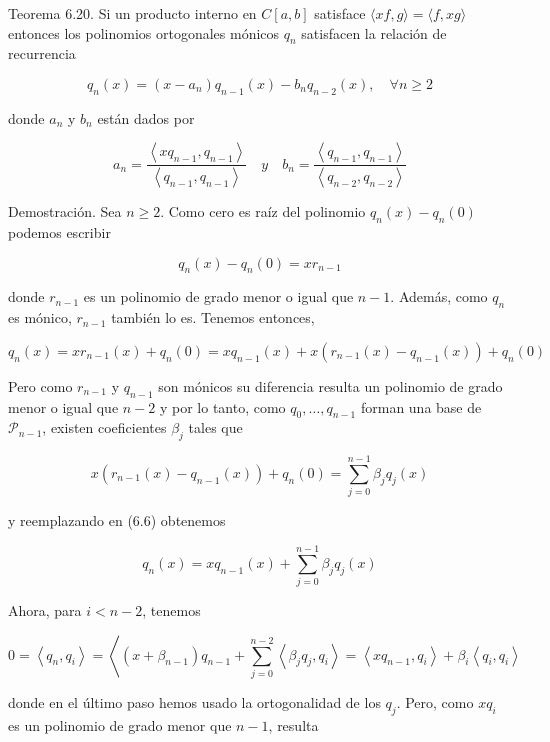 \documentclass[10pt]{book}
\begin{document}
Teorema 6.20. Si un producto interno en $C[a, b]$ satisface $\langle x f, g\rangle=\langle f, x g\rangle$ entonces los polinomios ortogonales mónicos $q_{n}$ satisfacen la relación de recurrencia


\begin{equation*}
q_{n}(x)=\left(x-a_{n}\right) q_{n-1}(x)-b_{n} q_{n-2}(x), \quad \forall n \geq 2 \tag{6.5}
\end{equation*}


donde $a_{n}$ y $b_{n}$ están dados por

$$
a_{n}=\frac{\left\langle x q_{n-1}, q_{n-1}\right\rangle}{\left\langle q_{n-1}, q_{n-1}\right\rangle} \quad y \quad b_{n}=\frac{\left\langle q_{n-1}, q_{n-1}\right\rangle}{\left\langle q_{n-2}, q_{n-2}\right\rangle}
$$

Demostración. Sea $n \geq 2$. Como cero es raíz del polinomio $q_{n}(x)-q_{n}(0)$ podemos escribir

$$
q_{n}(x)-q_{n}(0)=x r_{n-1}
$$

donde $r_{n-1}$ es un polinomio de grado menor o igual que $n-1$. Además, como $q_{n}$ es mónico, $r_{n-1}$ también lo es. Tenemos entonces,


\begin{equation*}
q_{n}(x)=x r_{n-1}(x)+q_{n}(0)=x q_{n-1}(x)+x\left(r_{n-1}(x)-q_{n-1}(x)\right)+q_{n}(0) \tag{6.6}
\end{equation*}


Pero como $r_{n-1}$ y $q_{n-1}$ son mónicos su diferencia resulta un polinomio de grado menor o igual que $n-2$ y por lo tanto, como $q_{0}, \ldots, q_{n-1}$ forman una base de $\mathcal{P}_{n-1}$, existen coeficientes $\beta_{j}$ tales que

$$
x\left(r_{n-1}(x)-q_{n-1}(x)\right)+q_{n}(0)=\sum_{j=0}^{n-1} \beta_{j} q_{j}(x)
$$

y reemplazando en (6.6) obtenemos


\begin{equation*}
q_{n}(x)=x q_{n-1}(x)+\sum_{j=0}^{n-1} \beta_{j} q_{j}(x) \tag{6.7}
\end{equation*}


Ahora, para $i<n-2$, tenemos

$$
0=\left\langle q_{n}, q_{i}\right\rangle=\left\langle\left(x+\beta_{n-1}\right) q_{n-1}+\sum_{j=0}^{n-2}\left\langle\beta_{j} q_{j}, q_{i}\right\rangle=\left\langle x q_{n-1}, q_{i}\right\rangle+\beta_{i}\left\langle q_{i}, q_{i}\right\rangle\right.
$$

donde en el último paso hemos usado la ortogonalidad de los $q_{j}$. Pero, como $x q_{i}$ es un polinomio de grado menor que $n-1$, resulta
\end{document}

